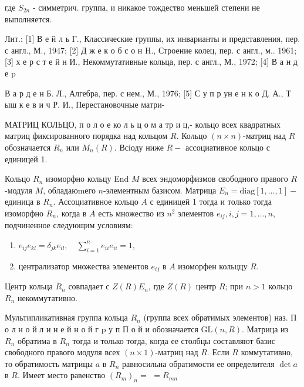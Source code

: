 \documentclass[10pt]{article}
\begin{document}
где $S_{2 n}$ - симметрич. группа, и никакое тождество меньшей степени не выполняется.



Лит.: [1] В е й л ь Г., Классические группы, их инварианты и представления, пер. с англ., М., 1947; [2] Д ж е к о б с о н H., Строение колец, пер. с англ., м.. 1961; [3] х е р с т е й н И., Некоммутативные кольца, пер. с англ., М., 1972; [4] В а н д е p

В а р д е н Б. Л., Алгебра, пер. с нем., М., 1976; [5] С у п р ун е н к о Д. А., Т ыш к е в и ч Р. И., Перестановочные матри-



МАТРИЦ КОЛЬЦО, п о л о е ко л ь ц о м а тр и ц,- кольцо всех квадратных матриц фиксированного порядка над кольцом $R$. Кольцо $(n \times n)$-матриц над $R$ обозначается $R_{n}$ или $M_{n}(R)$. Всіоду ниже $R-$ ассоциативное кольцо с единицей 1.



Кольцо $R_{n}$ изоморфно кольцу End $M$ всех эндоморфизмов свободного правого $R$-модуля $M$, обладаюmего $n$-элементным базисом. Матрица $E_{n}=\mathrm{diag}[1, \ldots, 1]-$ единица в $R_{n}$. Ассоциативное кольцо $A$ с единицей 1 тогда и только тогда изоморфно $R_{n}$, когда в $A$ есть множество из $n^{2}$ элементов $e_{i j}, i, j=1, \ldots, n$, подчиненное следующим условиям:



\begin{enumerate}

  \item $e_{i j} e_{k l}=\delta_{j k} e_{i l}, \quad \sum_{i=1}^{n} e_{i i} e_{i i}=1$,



  \item централизатор множества элементов $e_{i j}$ в $A$ изоморфен кольццу $R$.



\end{enumerate}



Центр кольца $\dot{R}_{n}$ совпадает с $Z(R) E_{n}$, где $Z(R)$ центр $R$; при $n>1$ кольцо $R_{n}$ некоммутативно.



Мультипликативная группа кольца $R_{n}$ (группа всех обратимых элементов) наз. П о л н о й л и н е й н о й г p у п П о й и обозначается $\mathrm{GL}(n, R)$. Матрица из $R_{n}$ обратима в $R_{n}$ тогда и только тогда, когда ее столбцы составляют базис свободного правого модуля всех $(n \times 1)$-матриц над $R$. Если $R$ коммутативно, то обратимость матрицы $a$ в $R_{n}$ равносильна обратимости ее определителя $\operatorname{det} a$ в $R$. Имеет место равенство $\left(R_{m}\right)_{n}=$ $=R_{m n}$
\end{document}
